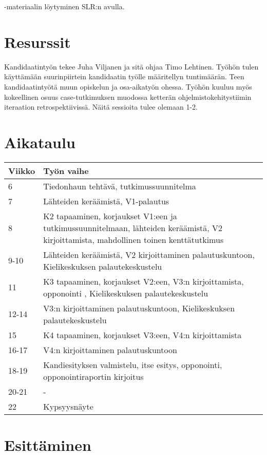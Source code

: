 \documentclass[12pt,a4paper,finnish,oneside]{article}
\begin{document}
-materiaalin löytyminen SLR:n avulla.

\section{Resurssit}

Kandidaatintyön tekee Juha Viljanen ja sitä ohjaa Timo Lehtinen. Työhön tulen käyttämään suurinpiirtein kandidaatin työlle määritellyn tuntimäärän. Teen kandidaatintyötä muun opiskelun ja osa-aikatyön ohessa.
Työhön kuuluu myös kokeellinen osuus case-tutkimuksen muodossa ketterän ohjelmistokehitystiimin iteraation retrospektiivissä. Näitä sessioita tulee olemaan 1-2.

\section{Aikataulu}

\begin{tabular}{|p{30mm}|p{120mm}|}
\hline
\bf{Viikko} & \bf{Työn vaihe} \\ \hline
6   & Tiedonhaun tehtävä, tutkimussuunnitelma \\ \hline
7   & Lähteiden keräämistä, V1-palautus \\ \hline
8  & K2 tapaaminen, korjaukset V1:een ja tutkimussuunnitelmaan, lähteiden keräämistä, V2 kirjoittamista, mahdollinen toinen kenttätutkimus \\ \hline
9-10 &  Lähteiden keräämistä, V2 kirjoittaminen palautuskuntoon, Kielikeskuksen palautekeskustelu \\ \hline
11 &  K3 tapaaminen, korjaukset V2:een, V3:n kirjoittamista, opponointi , Kielikeskuksen palautekeskustelu \\ \hline
12-14 & V3:n kirjoittaminen palautuskuntoon, Kielikeskuksen palautekeskustelu \\ \hline
15 & K4 tapaaminen, korjaukset V3:een, V4:n kirjoittamista \\ \hline
16-17 & V4:n kirjoittaminen palautuskuntoon \\ \hline
18-19 & Kandiesityksen valmistelu, itse esitys, opponointi, opponointiraportin kirjoitus \\ \hline
20-21 & - \\ \hline
22 & Kypsyysnäyte \\ \hline
\end{tabular}


\section{Esittäminen}
\end{document}
